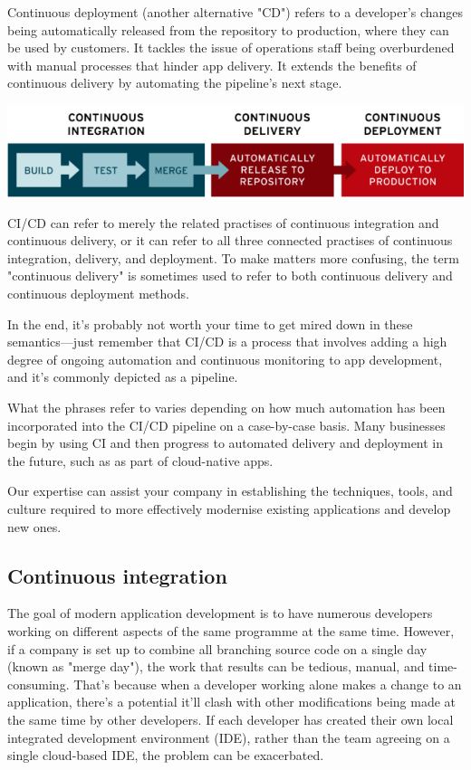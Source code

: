 \tab Continuous deployment (another alternative "CD") refers to a developer's changes being automatically released from the repository to production, where they can be used by customers. It tackles the issue of operations staff being overburdened with manual processes that hinder app delivery. It extends the benefits of continuous delivery by automating the pipeline's next stage.

\begin{center}
\includegraphics[width=400pt]{cicd image.PNG} 
\end{center}

\tab CI/CD can refer to merely the related practises of continuous integration and continuous delivery, or it can refer to all three connected practises of continuous integration, delivery, and deployment. To make matters more confusing, the term "continuous delivery" is sometimes used to refer to both continuous delivery and continuous deployment methods.

\tab In the end, it's probably not worth your time to get mired down in these semantics—just remember that CI/CD is a process that involves adding a high degree of ongoing automation and continuous monitoring to app development, and it's commonly depicted as a pipeline.

\tab What the phrases refer to varies depending on how much automation has been incorporated into the CI/CD pipeline on a case-by-case basis. Many businesses begin by using CI and then progress to automated delivery and deployment in the future, such as as part of cloud-native apps.

\tab Our expertise can assist your company in establishing the techniques, tools, and culture required to more effectively modernise existing applications and develop new ones.

\subsection*{Continuous integration}
\tab The goal of modern application development is to have numerous developers working on different aspects of the same programme at the same time. However, if a company is set up to combine all branching source code on a single day (known as "merge day"), the work that results can be tedious, manual, and time-consuming. That's because when a developer working alone makes a change to an application, there's a potential it'll clash with other modifications being made at the same time by other developers. If each developer has created their own local integrated development environment (IDE), rather than the team agreeing on a single cloud-based IDE, the problem can be exacerbated.

